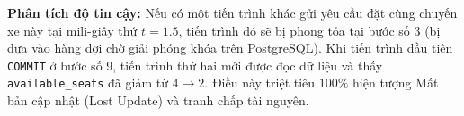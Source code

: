 \textbf{Phân tích độ tin cậy:} Nếu có một tiến trình khác gửi yêu cầu đặt cùng chuyến xe này tại mili-giây thứ $t=1.5$, tiến trình đó sẽ bị phong tỏa tại bước số 3 (bị đưa vào hàng đợi chờ giải phóng khóa trên PostgreSQL). Khi tiến trình đầu tiên \texttt{COMMIT} ở bước số 9, tiến trình thứ hai mới được đọc dữ liệu và thấy \texttt{available\_seats} đã giảm từ $4 \rightarrow 2$. Điều này triệt tiêu $100\%$ hiện tượng Mất bản cập nhật (Lost Update) và tranh chấp tài nguyên.
